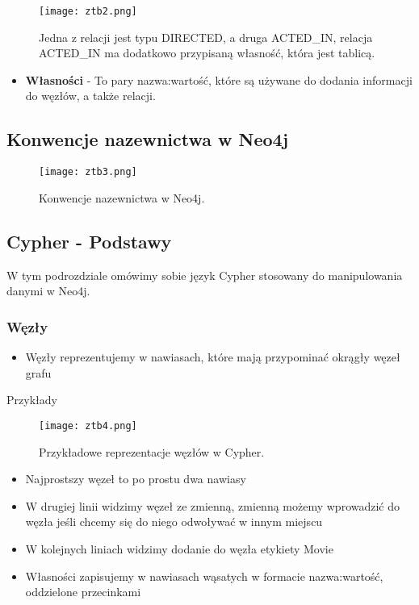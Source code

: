 \documentclass[a4paper,15pt]{article}
\begin{document}
\begin{figure}[H]
\centering
  \texttt{[image: ztb2.png]}
  \caption{Jedna z relacji jest typu DIRECTED, a druga ACTED\_IN, relacja ACTED\_IN ma dodatkowo przypisaną własność, która jest tablicą.}
  \label{fig:nodes}
\end{figure}

\begin{itemize}
\item \textbf{Własności} - To pary nazwa:wartość, które są używane do dodania informacji do węzłów, a także relacji.  
\end{itemize}

\subsection{Konwencje nazewnictwa w Neo4j}

\begin{figure}[H]
\centering
  \texttt{[image: ztb3.png]}
  \caption{Konwencje nazewnictwa w Neo4j.}
  \label{fig:nodes}
\end{figure}

\subsection{Cypher - Podstawy}
W tym podrozdziale omówimy sobie język Cypher stosowany do manipulowania danymi w Neo4j. 

\subsubsection{Węzły}
\begin{itemize}
\item Węzły reprezentujemy w nawiasach, które mają przypominać okrągły węzeł grafu
\end{itemize}
Przykłady
\begin{figure}[H]
\centering
  \texttt{[image: ztb4.png]}
  \caption{Przykładowe reprezentacje węzłów w Cypher.}
  \label{fig:nodes}
\end{figure}
\begin{itemize}
\item Najprostszy węzeł to po prostu dwa nawiasy
\item W drugiej linii widzimy węzeł ze zmienną, zmienną możemy wprowadzić do węzła jeśli chcemy się do niego odwoływać w innym miejscu
\item W kolejnych liniach widzimy dodanie do węzła etykiety Movie
\item Własności zapisujemy w nawiasach wąsatych w formacie nazwa:wartość, oddzielone przecinkami
\end{itemize}
\end{document}
